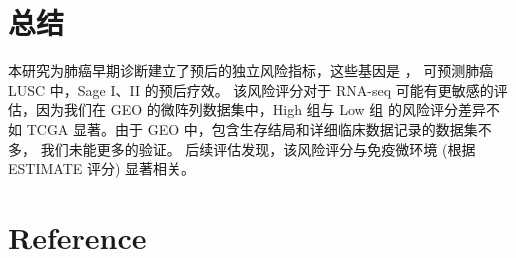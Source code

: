 \documentclass[
]{article}
\begin{document}
\hypertarget{conclusion}{%
\section{总结}\label{conclusion}}

本研究为肺癌早期诊断建立了预后的独立风险指标，这些基因是 ，
可预测肺癌 LUSC 中，Sage I、II 的预后疗效。
该风险评分对于 RNA-seq 可能有更敏感的评估，因为我们在 GEO 的微阵列数据集中，High 组与 Low 组
的风险评分差异不如 TCGA 显著。由于 GEO 中，包含生存结局和详细临床数据记录的数据集不多，
我们未能更多的验证。
后续评估发现，该风险评分与免疫微环境 (根据 ESTIMATE 评分) 显著相关。

\hypertarget{bibliography}{%
\section*{Reference}\label{bibliography}}
\end{document}
